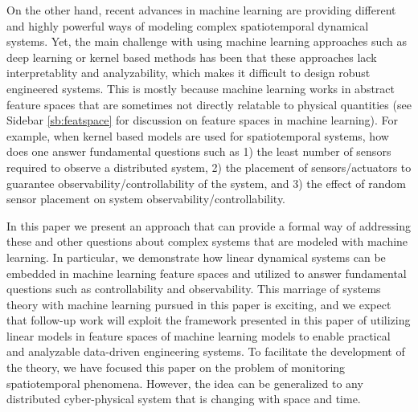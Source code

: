 On the other hand, recent advances in machine learning are providing different and highly powerful ways of modeling complex spatiotemporal dynamical systems.  %
Yet, the main challenge with using machine learning approaches such as deep learning or kernel based methods has been that these approaches lack interpretablity and analyzability, which makes it difficult to design robust engineered systems. This is mostly because machine learning works in abstract feature spaces that are sometimes not directly relatable to physical quantities (see Sidebar \ref{sb:featspace} for discussion on feature spaces in machine learning). For example, when kernel based models are used for spatiotemporal systems, how does one answer fundamental questions such as 1) the least number of sensors required to observe a distributed system, 2) the placement of sensors/actuators to guarantee observability/controllability of the system, and 3) the effect of random sensor placement on system observability/controllability.

In this paper we present an approach that can provide a formal way of addressing these and other questions about complex systems that are modeled with machine learning. In particular, we demonstrate how linear dynamical systems can be embedded in machine learning feature spaces and utilized to answer fundamental questions such as controllability and observability.  This marriage of systems theory with machine learning pursued in this paper is exciting, and %
 we expect that follow-up work will exploit the framework presented in this paper of utilizing linear models in feature spaces of machine learning models to enable practical and analyzable data-driven engineering systems. To facilitate the development of the theory, we have focused this paper on the problem of monitoring spatiotemporal phenomena. However, the idea can be generalized to any distributed cyber-physical system that is changing with space and time. %

